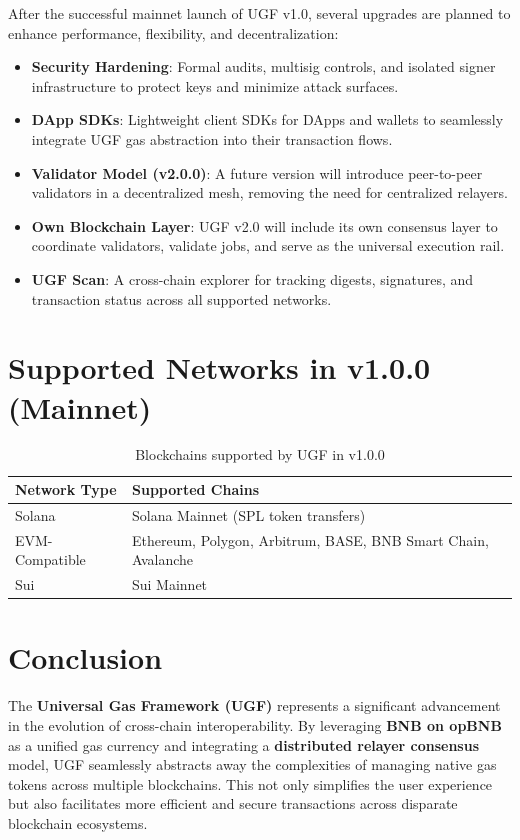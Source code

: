 \documentclass{article}
\begin{document}
After the successful mainnet launch of UGF v1.0, several upgrades are planned to enhance performance, flexibility, and decentralization:

\begin{itemize}
\item \textbf{Security Hardening}: Formal audits, multisig controls, and isolated signer infrastructure to protect keys and minimize attack surfaces.
\item \textbf{DApp SDKs}: Lightweight client SDKs for DApps and wallets to seamlessly integrate UGF gas abstraction into their transaction flows.
\item \textbf{Validator Model (v2.0.0)}: A future version will introduce peer-to-peer validators in a decentralized mesh, removing the need for centralized relayers.
\item \textbf{Own Blockchain Layer}: UGF v2.0 will include its own consensus layer to coordinate validators, validate jobs, and serve as the universal execution rail.
\item \textbf{UGF Scan}: A cross-chain explorer for tracking digests, signatures, and transaction status across all supported networks.
\end{itemize}

\section*{Supported Networks in v1.0.0 (Mainnet)}
\begin{table}[!htb]
\centering
\begin{tabular}{|l|l|}
\hline
\textbf{Network Type} & \textbf{Supported Chains} \\ \hline
Solana & Solana Mainnet (SPL token transfers) \\ \hline
EVM-Compatible & Ethereum, Polygon, Arbitrum, BASE, BNB Smart Chain, Avalanche \\ \hline
Sui & Sui Mainnet \\ \hline
\end{tabular}
\caption{Blockchains supported by UGF in v1.0.0}
\end{table}
\FloatBarrier


\section*{Conclusion}

The \textbf{Universal Gas Framework (UGF)} represents a significant advancement in the evolution of cross-chain interoperability. By leveraging \textbf{BNB on opBNB} as a unified gas currency and integrating a \textbf{distributed relayer consensus} model, UGF seamlessly abstracts away the complexities of managing native gas tokens across multiple blockchains. This not only simplifies the user experience but also facilitates more efficient and secure transactions across disparate blockchain ecosystems.
\end{document}
